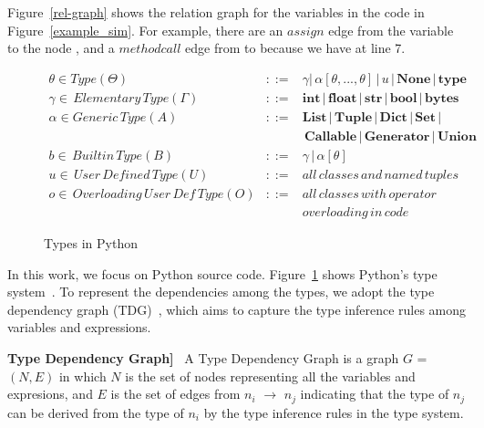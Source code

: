 Figure~\ref{rel-graph} shows the relation graph for the variables in
the code in Figure~\ref{example_sim}. For example, there are an
$assign$ edge from the variable  to the node
, and a $methodcall$ edge from  to
 because we have  at line
7.




\begin{figure}[t]
  \small
  \begin{eqnarray*}
    \theta \in Type (\Theta) &::=& \gamma | \, \alpha [\theta, ..., \theta] \, | \, u \, | \, \mathbf{None} \, | \, \mathbf{type}\\
  \gamma \in \, Elementary \, Type (\Gamma) &::=& \mathbf{int} \, | \, \mathbf{float} \, | \, \mathbf{str} \, | \, \mathbf{bool} \, | \, \mathbf{bytes}\\
  \alpha \in Generic \, Type (A) &::=& \mathbf{List} \, | \, \mathbf{Tuple} \, | \, \mathbf{Dict} \, | \, \mathbf{Set} \, |\\
  & & \, \mathbf{Callable} \, | \, \mathbf{Generator} \, | \, \mathbf{Union}\\
  b \in \, Builtin \, Type (B) &::=& \gamma \, | \, \alpha[\theta]\\
  u \in \, User \, Defined \, Type (U) &::=& all \, classes \, and \, named \, tuples\\
  o \in \, Overloading \, User \, Def \, Type (O) &::=& all \, classes \, with \, operator \\
  & & overloading \, in \, code
  \end{eqnarray*}
  \vspace{-18pt}
\caption{Types in Python}
\label{python-types}
\end{figure}

In this work, we focus on Python source
code. Figure~\ref{python-types} shows Python's type
system~\cite{type-graph-icse22}.
To represent the dependencies among the types, we adopt the type
dependency graph (TDG)~\cite{type-graph-icse22}, which aims to capture
the type inference rules among variables and expressions.

\begin{definition}{\bf Type Dependency Graph]}~\cite{type-graph-icse22}
    \label{tdg-def}
A Type Dependency Graph is a graph $G$ = $(N,E)$ in which $N$ is the
set of nodes representing all the variables and expresions, and $E$ is
the set of edges from $n_i$ $\rightarrow$ $n_j$ indicating that the type of $n_j$
can be derived from the type of $n_i$ by the type inference rules in
the type system.
\end{definition}

